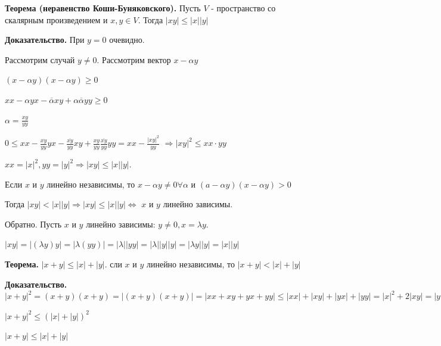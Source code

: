 \documentclass[a4paper]{article}
\begin{document}
    \begin{htheorem}
        \textbf{Теорема (неравенство Коши-Буняковского).} Пусть $V$ - пространство со скалярным произведением и $x,y \in V$. Тогда $|xy| \leq |x||y|$
    \end{htheorem}

    \begin{hproof}
        \textbf{Доказательство.} При $y=0$ очевидно.

        Рассмотрим случай $y \neq 0$. Рассмотрим вектор $x -\alpha y$

        $(x-\alpha y)(x-\alpha y) \geq 0$

        $xx - \alpha y x - \overline{\alpha} x y + \alpha \overline{\alpha} y y \geq 0$

        $\displaystyle \alpha = \frac{xy}{yy}$

        $\displaystyle 0 \leq xx - \frac{xy}{yy} yx - \frac{\overline{xy}}{yy} xy +  \frac{xy}{yy} \frac{\overline{xy}}{yy} yy = xx - \frac{|xy|^2}{yy}$ $\Rightarrow |xy|^2 \leq xx \cdot yy$

        $xx = |x|^2, yy = |y|^2 \Rightarrow |xy| \leq |x||y|$.

        Если $x$ и $y$ линейно независимы, то $x- \alpha y \neq 0 \forall \alpha$ и $(a-\alpha y)(x-\alpha y) > 0$

        Тогда $|xy| < |x||y| \Rightarrow |xy| \leq |x||y| \Leftrightarrow$ $x$ и $y$ линейно зависимы.

        Обратно. Пусть $x$ и $y$ линейно зависимы: $y \neq 0, x = \lambda y$.

        $|xy| = |(\lambda y) y| = |\lambda (yy)| = |\lambda| |yy| = |\lambda||y||y| = |\lambda y||y| = |x||y|$
    \end{hproof}

    \begin{htheorem}
        \textbf{Теорема.} $|x+y| \leq |x|+|y|$. сли $x$ и $y$ линейно независимы, то $|x+y| < |x|+ |y|$
    \end{htheorem}

    \begin{hproof}
        \textbf{Доказательство.}
        $|x+y|^2 = (x+y)(x+y) = |(x+y)(x+y)| = |xx+xy+yx+yy| \leq |xx| + |xy| + |yx| + |yy| = |x|^2 + 2|xy| = |y|^2 \leq |x|^2 + 2|x||y| + |y|^2 = (|x| + |y|)^2$

        $|x+y|^2 \leq (|x| + |y|)^2$

        $|x+y| \leq |x| + |y|$
    \end{hproof}
\end{document}
